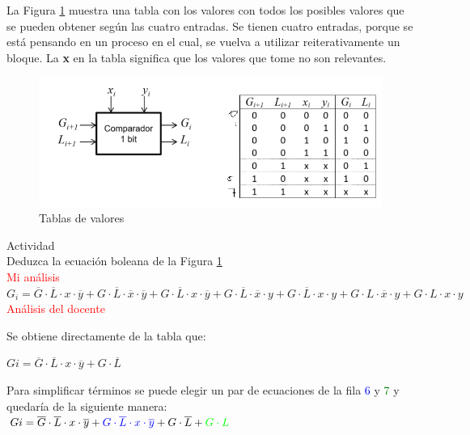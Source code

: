 \documentclass[12pt,letterpaper]{book}
\begin{document}
\begin{multicols}{2}
La Figura \ref{p4}  muestra  una tabla con los valores con todos los posibles valores que se pueden obtener según las cuatro entradas. Se tienen cuatro entradas, porque se está pensando en un proceso en el cual, se vuelva a utilizar reiterativamente un bloque. La \textbf{x} en la tabla significa que los valores que tome no son relevantes.

\begin{figure}[H]
\centering
\includegraphics[width=1\linewidth]{figures/p4.png}
\caption{Tablas de valores}
\label{p4}
\end{figure}
\vspace{0.2cm}
 
Actividad\\
Deduzca la ecuación boleana de la Figura \ref{p4}\\
\textcolor{red}{Mi análisis}\\

$G_i= \overline{G}\cdot \overline{L}\cdot x \cdot \overline{y} + G \cdot \overline{L}\cdot \overline{x}  \cdot \overline{y}+G\cdot \overline{L}\cdot x  \cdot \overline{y}  +G\cdot \overline{L}\cdot \overline{x}  \cdot y + G\cdot \overline{L}\cdot x  \cdot y + G\cdot L\cdot \overline{x}  \cdot y + G \cdot L \cdot x \cdot y$\\


\textcolor{red}{Análisis del docente}

Se obtiene directamente de la tabla que:

$Gi=\overline{G}\cdot \overline{L}\cdot x \cdot \overline{y} + G \cdot \overline{L}$

Para simplificar términos se puede elegir un par de ecuaciones de la fila \textcolor{blue}{6} y \textcolor{green}{7} y quedaría de la siguiente manera:\\
 
$Gi=\overline{G}\cdot \overline{L}\cdot x \cdot \overline{y} + \textcolor{blue}{G\cdot \overline{L}\cdot x \cdot \overline{y}} + G \cdot \overline{L}+\textcolor{green}{G \cdot L}$\\



\end{multicols}
\end{document}
